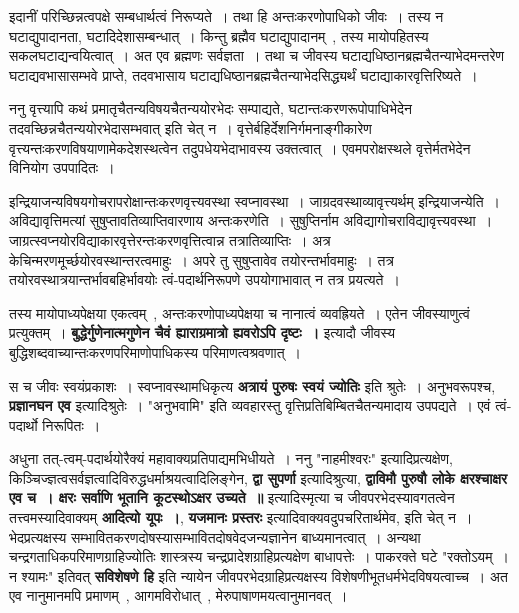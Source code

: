 	इदानीं परिच्छिन्नत्वपक्षे सम्बधार्थत्वं निरूप्यते~। तथा हि अन्तःकरणोपाधिको जीवः~। तस्य न घटाद्युपादानता, घटादिदेशासम्बन्धात्~। किन्तु ब्रह्मैव घटाद्युपादानम्~, तस्य मायोपहितस्य सकलघटाद्यन्वयित्वात्~। अत एव ब्रह्मणः सर्वज्ञता~। तथा च जीवस्य घटाद्यधिष्ठानब्रह्मचैतन्याभेदमन्तरेण घटाद्यवभासासम्भवे प्राप्ते, तदवभासाय घटाद्यधिष्ठानब्रह्मचैतन्याभेदसिद्ध्यर्थं घटाद्याकारवृत्तिरिष्यते~।\par
	ननु वृत्त्यापि कथं प्रमातृचैतन्यविषयचैतन्ययोरभेदः सम्पाद्यते, घटान्तःकरणरूपोपाधिभेदेन तदवच्छिन्नचैतन्ययोरभेदासम्भवात् इति चेत् न~। वृत्तेर्बहिर्देशनिर्गमनाङ्गीकारेण वृत्त्यन्तःकरणविषयाणामेकदेशस्थत्वेन तदुपधेयभेदाभावस्य उक्तत्वात्~। एवमपरोक्षस्थले वृत्तेर्मतभेदेन विनियोग उपपादितः~।\par
	इन्द्रियाजन्यविषयगोचरापरोक्षान्तःकरणवृत्त्यवस्था स्वप्नावस्था~। जाग्रदवस्थाव्यावृत्त्यर्थम् इन्द्रियाजन्येति~। अविद्यावृत्तिमत्यां सुषुप्तावतिव्याप्तिवारणाय अन्तःकरणेति~। सुषुप्तिर्नाम अविद्यागोचराविद्यावृत्त्यवस्था~। जाग्रत्स्वप्नयोरविद्याकारवृत्तेरन्तःकरणवृत्तित्वान्न तत्रातिव्याप्तिः~। अत्र केचिन्मरणमूर्च्छयोरवस्थान्तरत्वमाहुः~। अपरे तु सुषुप्तावेव तयोरन्तर्भावमाहुः~। तत्र तयोरवस्थात्रयान्तर्भावबहिर्भावयोः त्वं-पदार्थनिरूपणे उपयोगाभावात् न तत्र प्रयत्यते~।\par
	तस्य मायोपाध्यपेक्षया एकत्वम्~, अन्तःकरणोपाध्यपेक्षया च नानात्वं व्यवह्रियते~। एतेन जीवस्याणुत्वं प्रत्युक्तम्~। {\bfseries बुद्धेर्गुणेनात्मगुणेन चैवं ह्याराग्रमात्रो ह्यवरोऽपि दृष्टः~।} इत्यादौ जीवस्य बुद्धिशब्दवाच्यान्तःकरणपरिमाणोपाधिकस्य परिमाणत्वश्रवणात्~।\par
	स च जीवः स्वयंप्रकाशः~। स्वप्नावस्थामधिकृत्य {\bfseries अत्रायं पुरुषः स्वयं ज्योतिः} इति श्रुतेः~। अनुभवरूपश्च, {\bfseries प्रज्ञानघन एव} इत्यादिश्रुतेः~। "अनुभवामि" इति व्यवहारस्तु वृत्तिप्रतिबिम्बितचैतन्यमादाय उपपद्यते~। एवं त्वं-पदार्थो निरूपितः~।\par
	अधुना तत्-त्वम्-पदार्थयोरैक्यं महावाक्यप्रतिपाद्यमभिधीयते~। ननु "नाहमीश्वरः" इत्यादिप्रत्यक्षेण, किञ्चिज्ज्ञत्वसर्वज्ञत्वादिविरुद्धधर्माश्रयत्वादिलिङ्गेन, {\bfseries द्वा सुपर्णा} इत्यादिश्रुत्या, {\bfseries द्वाविमौ पुरुषौ लोके क्षरश्चाक्षर एव च~। क्षरः सर्वाणि भूतानि कूटस्थोऽक्षर उच्यते~॥} इत्यादिस्मृत्या च जीवपरभेदस्यावगतत्वेन तत्त्वमस्यादिवाक्यम् {\bfseries आदित्यो यूपः~।}, {\bfseries यजमानः प्रस्तरः} इत्यादिवाक्यवदुपचरितार्थमेव, इति चेत् न~। भेदप्रत्यक्षस्य सम्भावितकरणदोषस्यासम्भावितदोषवेदजन्यज्ञानेन बाध्यमानत्वात्~। अन्यथा चन्द्रगताधिकपरिमाणग्राहिज्योतिः शास्त्रस्य चन्द्रप्रादेशग्राहिप्रत्यक्षेण बाधापत्तेः~। पाकरक्ते घटे "रक्तोऽयम्~। न श्यामः" इतिवत् {\bfseries सविशेषणे हि} इति न्यायेन जीवपरभेदग्राहिप्रत्यक्षस्य विशेषणीभूतधर्मभेदविषयत्वाच्च~। अत एव नानुमानमपि प्रमाणम्~, आगमविरोधात्~, मेरुपाषाणमयत्वानुमानवत्~।\par
